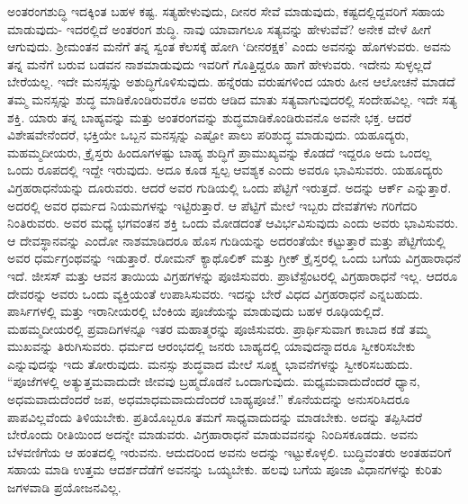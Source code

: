 ಅಂತರಂಗಶುದ್ಧಿ ಇದಕ್ಕಿಂತ ಬಹಳ ಕಷ್ಟ. ಸತ್ಯಹೇಳುವುದು, ದೀನರ ಸೇವೆ ಮಾಡುವುದು, ಕಷ್ಟದಲ್ಲಿದ್ದವರಿಗೆ ಸಹಾಯ ಮಾಡುವುದು- ಇದರಲ್ಲಿದೆ ಅಂತರಂಗ ಶುದ್ಧಿ. ನಾವು ಯಾವಾಗಲೂ ಸತ್ಯವನ್ನು ಹೇಳುವೆವೆ? ಅನೇಕ ವೇಳೆ ಹೀಗೆ ಆಗುವುದು. ಶ‍್ರೀಮಂತನ ಮನೆಗೆ ತನ್ನ ಸ್ವಂತ ಕೆಲಸಕ್ಕೆ ಹೋಗಿ ‘ದೀನರಕ್ಷಕ’ ಎಂದು ಅವನನ್ನು ಹೊಗಳುವರು. ಅವನು ತನ್ನ ಮನೆಗೆ ಬರುವ ಬಡವನ ನಾಶಮಾಡುವುದು ಇವರಿಗೆ ಗೊತ್ತಿದ್ದರೂ ಹಾಗೆ ಹೇಳುವರು. ಇದೇನು ಸುಳ್ಳಲ್ಲದೆ ಬೇರೆಯಲ್ಲ. ಇದೇ ಮನಸ್ಸನ್ನು ಅಶುದ್ಧಿಗೊಳಿಸುವುದು. ಹನ್ನೆರಡು ವರುಷಗಳಿಂದ ಯಾರು ಹೀನ ಆಲೋಚನೆ ಮಾಡದೆ ತಮ್ಮ ಮನಸ್ಸನ್ನು ಶುದ್ಧ ಮಾಡಿಕೊಂಡಿರುವರೊ ಅವರು ಆಡಿದ ಮಾತು ಸತ್ಯವಾಗುವುದರಲ್ಲಿ ಸಂದೇಹವಿಲ್ಲ. ಇದೇ ಸತ್ಯ ಶಕ್ತಿ. ಯಾರು ತನ್ನ ಬಾಹ್ಯವನ್ನು ಮತ್ತು ಅಂತರಂಗವನ್ನು ಶುದ್ಧಮಾಡಿಕೊಂಡಿರುವನೊ ಅವನೇ ಭಕ್ತ. ಆದರೆ ವಿಶೇಷವೇನೆಂದರೆ, ಭಕ್ತಿಯೇ ಒಬ್ಬನ ಮನಸ್ಸನ್ನು ಎಷ್ಟೋ ಪಾಲು ಪರಿಶುದ್ಧ ಮಾಡುವುದು. ಯಹೂದ್ಯರು, ಮಹಮ್ಮದೀಯರು, ಕ್ರೈಸ್ತರು ಹಿಂದೂಗಳಷ್ಟು ಬಾಹ್ಯ ಶುದ್ಧಿಗೆ ಪ್ರಾಮುಖ್ಯವನ್ನು ಕೊಡದೆ ಇದ್ದರೂ ಅದು ಒಂದಲ್ಲ ಒಂದು ರೂಪದಲ್ಲಿ ಇದ್ದೇ ಇರುವುದು. ಅದೂ ಕೂಡ ಸ್ವಲ್ಪ ಆವಶ್ಯಕ ಎಂದು ಅವರೂ ಭಾವಿಸುವರು. ಯಹೂದ್ಯರು ವಿಗ್ರಹರಾಧನೆಯನ್ನು ದೂರುವರು. ಆದರೆ ಅವರ ಗುಡಿಯಲ್ಲಿ ಒಂದು ಪೆಟ್ಟಿಗೆ ಇರುತ್ತದೆ. ಅದನ್ನು ಆರ್ಕ್​ ಎನ್ನುತ್ತಾರೆ. ಅದರಲ್ಲಿ ಅವರ ಧರ್ಮದ ನಿಯಮಗಳನ್ನು ಇಟ್ಟಿರುತ್ತಾರೆ. ಆ ಪೆಟ್ಟಿಗೆ ಮೇಲೆ ಇಬ್ಬರು ದೇವತೆಗಳು ಗರಿಗೆದರಿ ನಿಂತಿರುವರು. ಅವರ ಮಧ್ಯೆ ಭಗವಂತನ ಶಕ್ತಿ ಒಂದು ಮೋಡದಂತೆ ಆವಿರ್ಭವಿಸುವುದು ಎಂದು ಅವರು ಭಾವಿಸುವರು. ಆ ದೇವಸ್ಥಾನವನ್ನು ಎಂದೋ ನಾಶಮಾಡಿದರೂ ಹೊಸ ಗುಡಿಯನ್ನು ಅದರಂತೆಯೇ ಕಟ್ಟುತ್ತಾರೆ ಮತ್ತು ಪೆಟ್ಟಿಗೆಯಲ್ಲಿ ಅವರ ಧರ್ಮಗ್ರಂಥವನ್ನು ಇಡುತ್ತಾರೆ. ರೋಮನ್​ ಕ್ಯಾಥೊಲಿಕ್​ ಮತ್ತು ಗ್ರೀಕ್​ ಕ್ರೈಸ್ತರಲ್ಲಿ ಒಂದು ಬಗೆಯ ವಿಗ್ರಹಾರಾಧನೆ ಇದೆ. ಜೀಸಸ್​ ಮತ್ತು ಆವನ ತಾಯಿಯ ವಿಗ್ರಹಗಳನ್ನು ಪೂಜಿಸುವರು. ಪ್ರಾಟೆಸ್ಟೆಂಟರಲ್ಲಿ ವಿಗ್ರಹಾರಾಧನೆ ಇಲ್ಲ. ಆದರೂ ದೇವರನ್ನು ಅವರು ಒಂದು ವ್ಯಕ್ತಿಯಂತೆ ಉಪಾಸಿಸುವರು. ಇದನ್ನು ಬೇರೆ ವಿಧದ ವಿಗ್ರಹರಾಧನೆ ಎನ್ನಬಹುದು. ಪಾರ್ಸಿಗಳಲ್ಲಿ ಮತ್ತು ಇರಾನೀಯರಲ್ಲಿ ಬೆಂಕಿಯ ಪೂಜೆಯನ್ನು ಮಾಡುವುದು ಬಹಳ ರೂಢಿಯಲ್ಲಿದೆ. ಮಹಮ್ಮದೀಯರಲ್ಲಿ ಪ್ರವಾದಿಗಳನ್ನೂ ಇತರ ಮಹಾತ್ಮರನ್ನು ಪೂಜಿಸುವರು. ಪ್ರಾರ್ಥಿಸುವಾಗ ಕಾಬಾದ ಕಡೆ ತಮ್ಮ ಮುಖವನ್ನು ತಿರುಗಿಸುವರು. ಧರ್ಮದ ಆರಂಭದಲ್ಲಿ ಜನರು ಬಾಹ್ಯದಲ್ಲಿ ಯಾವುದನ್ನಾದರೂ ಸ್ವೀಕರಿಸಬೇಕು ಎನ್ನುವುದನ್ನು ಇದು ತೋರುವುದು. ಮನಸ್ಸು ಶುದ್ಧವಾದ ಮೇಲೆ ಸೂಕ್ಷ್ಮ ಭಾವನೆಗಳನ್ನು ಸ್ವೀಕರಿಸಬಹುದು. “ಪೂಜೆಗಳಲ್ಲಿ ಅತ್ಯುತ್ತಮವಾದುದೇ ಜೀವವು ಬ್ರಹ್ಮದೊಡನೆ ಒಂದಾಗುವುದು. ಮಧ್ಯಮವಾದುದೆಂದರೆ ಧ್ಯಾನ, ಅಧಮವಾದುದೆಂದರೆ ಜಪ, ಅಧಮಾಧಮವಾದುದೆಂದರೆ ಬಾಹ್ಯಪೂಜೆ.” ಕೊನೆಯದನ್ನು ಅನುಸರಿಸಿದರೂ ಪಾಪವಿಲ್ಲವೆಂದು ತಿಳಿಯಬೇಕು. ಪ್ರತಿಯೊಬ್ಬರೂ ತಮಗೆ ಸಾಧ್ಯವಾದುದನ್ನು ಮಾಡಬೇಕು. ಅದನ್ನು ತಪ್ಪಿಸಿದರೆ ಬೇರೊಂದು ರೀತಿಯಿಂದ ಅದನ್ನೇ ಮಾಡುವರು. ವಿಗ್ರಹಾರಾಧನೆ ಮಾಡುವವನನ್ನು ನಿಂದಿಸಕೂಡದು. ಅವನು ಬೆಳವಣಿಗೆಯ ಆ ಹಂತದಲ್ಲಿ ಇರುವನು. ಆದುದರಿಂದ ಅವನು ಅದನ್ನು ಇಟ್ಟುಕೊಳ್ಳಲಿ. ಬುದ್ಧಿವಂತರು ಅಂತಹವರಿಗೆ ಸಹಾಯ ಮಾಡಿ ಉತ್ತಮ ಆದರ್ಶದೆಡೆಗೆ ಅವನನ್ನು ಒಯ್ಯಬೇಕು. ಹಲವು ಬಗೆಯ ಪೂಜಾ ವಿಧಾನಗಳನ್ನು ಕುರಿತು ಜಗಳವಾಡಿ ಪ್ರಯೋಜನವಿಲ್ಲ.

